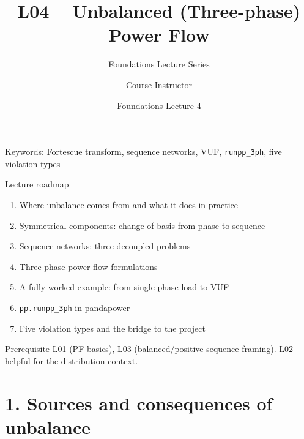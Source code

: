 \documentclass[aspectratio=169,10pt]{beamer}
\title[L04: Unbalanced PF]{L04 -- Unbalanced (Three-phase) Power Flow}
\subtitle{Foundations Lecture Series}
\author{Course Instructor}
\institute{Microgrid 3-phase Security AI Project}
\date{Foundations Lecture 4}
\newcommand{\code}[1]{\texttt{#1}}
\begin{document}
\begin{frame}
  \titlepage
  \vspace{-0.8em}
  \begin{center}
    \small Keywords: Fortescue transform, sequence networks, VUF, \code{runpp\_3ph}, five violation types
  \end{center}
\end{frame}

\begin{frame}{Lecture roadmap}
\begin{enumerate}
  \item Where unbalance comes from and what it does in practice
  \item Symmetrical components: change of basis from phase to sequence
  \item Sequence networks: three decoupled problems
  \item Three-phase power flow formulations
  \item A fully worked example: from single-phase load to VUF
  \item \code{pp.runpp\_3ph} in pandapower
  \item Five violation types and the bridge to the project
\end{enumerate}
\vspace{0.6em}
\begin{block}{Prerequisite}
L01 (PF basics), L03 (balanced/positive-sequence framing). L02 helpful for the distribution context.
\end{block}
\end{frame}

\section*{1. Sources and consequences of unbalance}
\end{document}
